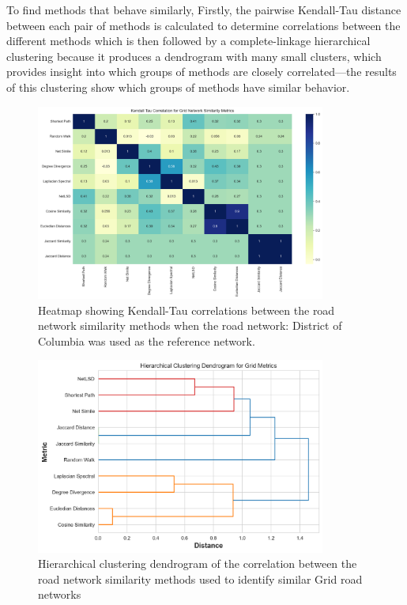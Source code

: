 To find methods that behave similarly, Firstly, the pairwise Kendall-Tau distance between each pair of methods is calculated to determine correlations between the different methods which is then followed by a complete-linkage hierarchical clustering because it produces a dendrogram with many small clusters, which provides insight into which groups of methods are closely correlated—the results of this clustering show which groups of methods have similar behavior. 


\begin{figure}[!ht]
\centering
\includegraphics[width=0.85\textwidth,center]{picture/Grid/grid2.png}
\caption[Heatmap showing Kendall-Tau correlations between the road network similarity methods for Grid Road Networks]{Heatmap showing Kendall-Tau correlations between the road network similarity methods when the road network: District of Columbia was used as the reference network.}
\label{fig:network ranking}
\end{figure}

\begin{figure}[!ht]
\centering
\includegraphics[width=0.85\textwidth,center]{picture/Grid/grid_metrics_dendrogram.png}
\caption[Hierarchical Clustering Dendrogram of the Correlation between the Road Network Similarity Methods for Grid Road Networks]{Hierarchical clustering dendrogram of the correlation between the road network similarity methods used to identify similar Grid road networks}
\label{fig:Hierarchical Clustering Dendrogram of the Correlation between the Road Network Similarity Methods for Grid Road Networks}
\end{figure}

